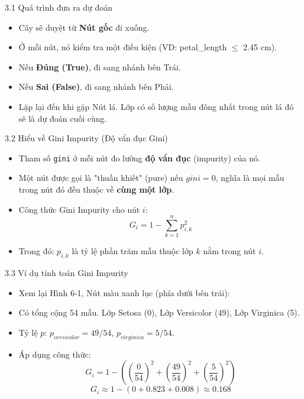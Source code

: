 \documentclass[aspectratio=169, 12pt]{beamer}
\begin{document}
\begin{frame}{3.1 Quá trình đưa ra dự đoán}
    \begin{itemize}
        \item Cây sẽ duyệt từ \textbf{Nút gốc} đi xuống.
        \item Ở mỗi nút, nó kiểm tra một điều kiện (VD: petal\_length $\le$ 2.45 cm).
        \item Nếu \textbf{Đúng (True)}, đi sang nhánh bên Trái.
        \item Nếu \textbf{Sai (False)}, đi sang nhánh bên Phải.
        \item Lặp lại đến khi gặp Nút lá. Lớp có số lượng mẫu đông nhất trong nút lá đó sẽ là dự đoán cuối cùng.
    \end{itemize}
\end{frame}

\begin{frame}{3.2 Hiểu về Gini Impurity (Độ vẩn đục Gini)}
    \begin{itemize}
        \item Tham số \texttt{gini} ở mỗi nút đo lường \textbf{độ vẩn đục} (impurity) của nó.
        \item Một nút được gọi là "thuần khiết" (pure) nếu $gini = 0$, nghĩa là mọi mẫu trong nút đó đều thuộc về \textbf{cùng một lớp}.
        \item Công thức Gini Impurity cho nút $i$:
        $$ G_i = 1 - \sum_{k=1}^{n} p_{i,k}^2 $$
        \item Trong đó: $p_{i,k}$ là tỷ lệ phần trăm mẫu thuộc lớp $k$ nằm trong nút $i$.
    \end{itemize}
\end{frame}

\begin{frame}{3.3 Ví dụ tính toán Gini Impurity}
    \begin{itemize}
        \item Xem lại Hình 6-1, Nút màu xanh lục (phía dưới bên trái):
        \item Có tổng cộng 54 mẫu. Lớp Setosa (0), Lớp Versicolor (49), Lớp Virginica (5).
        \item Tỷ lệ $p$: $p_{versicolor} = 49/54$, $p_{virginica} = 5/54$.
        \item Áp dụng công thức:
        $$ G_i = 1 - \left(\left(\frac{0}{54}\right)^2 + \left(\frac{49}{54}\right)^2 + \left(\frac{5}{54}\right)^2\right) $$
        $$ G_i \approx 1 - (0 + 0.823 + 0.008) \approx 0.168 $$
    \end{itemize}
\end{frame}
\end{document}
